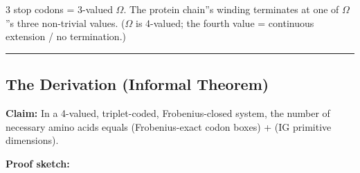 \documentclass[12pt,a4paper]{article}
\begin{document}
3 stop codons = 3-valued $\Omega$. The protein chain''s winding terminates at one of
$\Omega$''s three non-trivial values. ($\Omega$ is 4-valued; the fourth value = continuous
extension / no termination.)

\begin{center}
\rule{0.5\textwidth}{0.4pt}
\end{center}

\subsection{The Derivation (Informal Theorem)}

\textbf{Claim:} In a 4-valued, triplet-coded, Frobenius-closed system, the number of
necessary amino acids equals (Frobenius-exact codon boxes) + (IG primitive dimensions).

\textbf{Proof sketch:}
\end{document}
